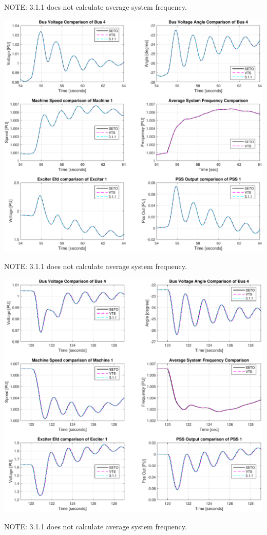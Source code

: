 \documentclass[12pt]{article}
\begin{document}
NOTE: 3.1.1 does not calculate average system frequency.

\includegraphics[width=\linewidth]{verCompDetail1}

NOTE: 3.1.1 does not calculate average system frequency.

\includegraphics[width=\linewidth]{verCompDetail2}

NOTE: 3.1.1 does not calculate average system frequency.
\end{document}
